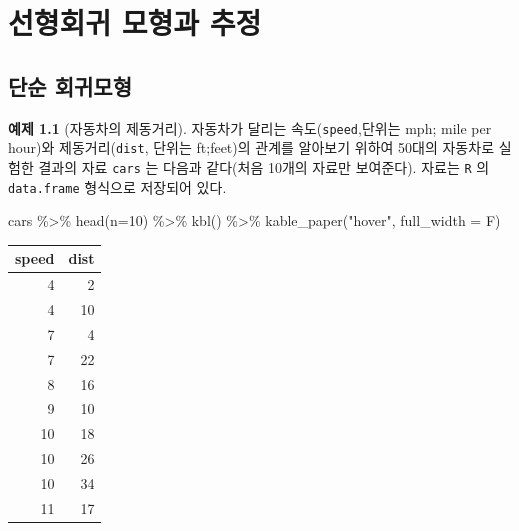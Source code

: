 \documentclass[
  10pt,
]{book}
\newenvironment{Shaded}{\begin{snugshade}}{\end{snugshade}}
\newcommand{\AttributeTok}[1]{\textcolor[rgb]{0.77,0.63,0.00}{#1}}
\newcommand{\DecValTok}[1]{\textcolor[rgb]{0.00,0.00,0.81}{#1}}
\newcommand{\FunctionTok}[1]{\textcolor[rgb]{0.00,0.00,0.00}{#1}}
\newcommand{\NormalTok}[1]{#1}
\newcommand{\SpecialCharTok}[1]{\textcolor[rgb]{0.00,0.00,0.00}{#1}}
\newcommand{\StringTok}[1]{\textcolor[rgb]{0.31,0.60,0.02}{#1}}
\theoremstyle{definition}
\theoremstyle{definition}
\newtheorem{example}{예제}[chapter]
\theoremstyle{definition}
\theoremstyle{definition}
\theoremstyle{remark}
\begin{document}
\mainmatter

\hypertarget{lse}{%
\chapter{선형회귀 모형과 추정}\label{lse}}

\hypertarget{uxb2e8uxc21c-uxd68cuxadc0uxbaa8uxd615}{%
\section{단순 회귀모형}\label{uxb2e8uxc21c-uxd68cuxadc0uxbaa8uxd615}}

\begin{example}[자동차의 제동거리]
\protect\hypertarget{exm:unnamed-chunk-4}{}{\label{exm:unnamed-chunk-4} {} }
자동차가 달리는 속도(\texttt{speed},단위는 mph; mile per hour)와 제동거리(\texttt{dist}, 단위는 ft;feet)의 관계를 알아보기 위하여 50대의 자동차로 실험한 결과의 자료 \texttt{cars} 는 다음과 같다(처음 10개의 자료만 보여준다). 자료는 \texttt{R} 의 \texttt{data.frame} 형식으로 저장되어 있다.
\end{example}

\begin{Shaded}
\begin{Highlighting}[]
\NormalTok{cars }\SpecialCharTok{\%\textgreater{}\%} \FunctionTok{head}\NormalTok{(}\AttributeTok{n=}\DecValTok{10}\NormalTok{) }\SpecialCharTok{\%\textgreater{}\%} \FunctionTok{kbl}\NormalTok{() }\SpecialCharTok{\%\textgreater{}\%}  \FunctionTok{kable\_paper}\NormalTok{(}\StringTok{"hover"}\NormalTok{, }\AttributeTok{full\_width =}\NormalTok{ F)}
\end{Highlighting}
\end{Shaded}

\begin{table}
\centering
\begin{tabular}[t]{r|r}
\hline
speed & dist\\
\hline
4 & 2\\
\hline
4 & 10\\
\hline
7 & 4\\
\hline
7 & 22\\
\hline
8 & 16\\
\hline
9 & 10\\
\hline
10 & 18\\
\hline
10 & 26\\
\hline
10 & 34\\
\hline
11 & 17\\
\hline
\end{tabular}
\end{table}
\end{document}

